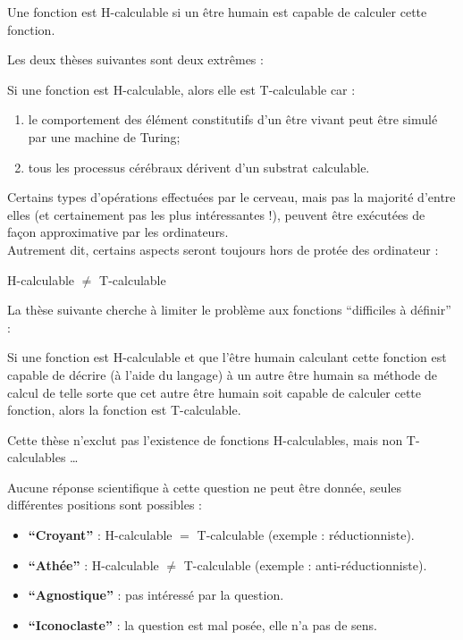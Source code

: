 \begin{description}
\begin{mydef}[H-calculable]
Une fonction est H-calculable si un être humain est capable de calculer cette fonction.
\end{mydef}

Les deux thèses suivantes sont deux extrêmes :
\begin{mythese}
Si une fonction est H-calculable, alors elle est T-calculable car :
\begin{enumerate}
	\item le comportement des élément constitutifs d'un être vivant peut être simulé par une machine de Turing;
	\item tous les processus cérébraux dérivent d'un substrat calculable.
\end{enumerate}
\end{mythese}

\begin{mythese}
Certains types d'opérations effectuées par le cerveau, mais pas la majorité d'entre elles (et certainement pas les plus intéressantes !), peuvent être exécutées de façon approximative par les ordinateurs.\\
Autrement dit, certains aspects seront toujours hors de protée des ordinateur :
\begin{center}
H-calculable $\neq$ T-calculable
\end{center}
\end{mythese}

La thèse suivante cherche à limiter le problème aux fonctions ``difficiles à définir'' :
\begin{mythese}
Si une fonction est H-calculable et que l'être humain calculant cette fonction est capable de décrire (à l'aide du langage) à un autre être humain sa méthode de calcul de telle sorte que cet autre être humain soit capable de calculer cette fonction, alors la fonction est T-calculable.
\end{mythese}

\begin{myrem}
Cette thèse n'exclut pas l'existence de fonctions H-calculables, mais non T-calculables \dots
\end{myrem}

Aucune réponse scientifique à cette question ne peut être donnée, seules différentes positions sont possibles :
\begin{itemize}
	\item \textbf{``Croyant''} : H-calculable $=$ T-calculable (exemple : réductionniste).
	\item \textbf{``Athée''} : H-calculable $\neq$ T-calculable (exemple : anti-réductionniste).
	\item \textbf{``Agnostique''} : pas intéressé par la question.
	\item \textbf{``Iconoclaste''} : la question est mal posée, elle n'a pas de sens.
\end{itemize}


\end{description}
